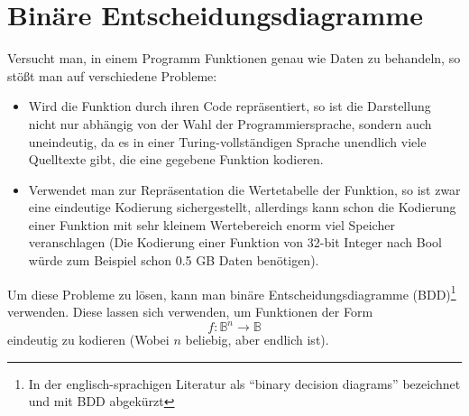 \section{Binäre Entscheidungsdiagramme}
\label{sec:bdd}
Versucht man, in einem Programm Funktionen genau wie Daten zu behandeln, so stößt man auf verschiedene Probleme:
\begin{itemize}
\item Wird die Funktion durch ihren Code repräsentiert, so ist die Darstellung nicht nur abhängig von der Wahl der Programmiersprache, sondern auch uneindeutig, da es in einer Turing-vollständigen Sprache unendlich viele Quelltexte gibt, die eine gegebene Funktion kodieren.
\item Verwendet man zur Repräsentation die Wertetabelle der Funktion, so ist zwar eine eindeutige Kodierung sichergestellt, allerdings kann schon die Kodierung einer Funktion mit sehr kleinem Wertebereich enorm viel Speicher veranschlagen (Die Kodierung einer Funktion von 32-bit Integer nach Bool würde zum Beispiel schon 0.5 GB Daten benötigen).
\end{itemize}
Um diese Probleme zu lösen, kann man binäre Entscheidungsdiagramme (BDD)\footnote{In der englisch-sprachigen Literatur als "`binary decision diagrams"' bezeichnet und mit BDD abgekürzt} verwenden.
Diese lassen sich verwenden, um Funktionen der Form
\[ f : \mathbb{B}^n\rightarrow\mathbb{B} \]
eindeutig zu kodieren (Wobei $n$ beliebig, aber endlich ist).

